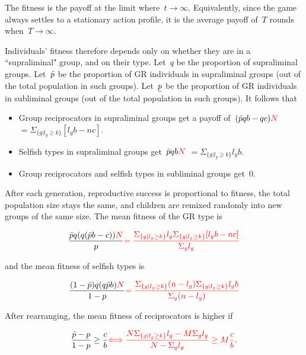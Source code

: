 \documentclass[12pt,a4paper]{article}
\newcommand{\mm}[1]{{\color{red} #1}}
\begin{document}
The fitness is the payoff at the limit where~$t\to\infty$. Equivalently, since the game always settles to a stationary action profile, it is the average payoff of~$T$ rounds when~$T\to\infty$. 

%
Individuals' fitness therefore depends only on whether they are in a ``supraliminal" group, and on their type. Let~$q$ be the 
proportion of supraliminal groups. Let~$\bar{p}$ be the proportion of 
GR individuals in supraliminal groups (out of the total population in such groups). Let~$\underline{p}$ be the proportion of GR individuals in subliminal groups (out of the total population in such groups). It follows that
\begin{itemize}
    \item Group reciprocators in supraliminal groups get a payoff of~$(\bpi qb - qc)\mm{N}$ \mm{$= \Sigma_{\{g|l_g \geq k\}}[l_gb-nc]$}.
    \item Selfish types in supraliminal groups get~$\bpi qb\mm{N}$ \mm{$= \Sigma_{\{g|l_g \geq k\}}l_gb$}.
    \item Group reciprocators and selfish types in subliminal groups get~$0$.
\end{itemize}

After each generation, reproductive success is proportional to fitness, the total population size stays the same, and children are remixed randomly into new groups of the same size.
%
The mean fitness of the GR type is

\begin{equation*}
\frac{
  \bpi q(q(\bpi b - c))\mm{N}
}{
  p
}
\mm{=\frac{\Sigma_{\{g|l_g \geq k\}}l_g \Sigma_{\{g|l_g \geq k\}}[l_gb-nc]}{\Sigma_gl_g}}
\end{equation*}

and the mean fitness of selfish types is

\begin{equation*}
\frac{
  (1 - \bpi)q(q\bpi b)\mm{N}
}{
  1 - p
}
\mm{=\frac{\Sigma_{\{g|l_g \geq k\}}(n-l_g) \Sigma_{\{g|l_g \geq k\}}l_gb}{\Sigma_g(n-l_g)}}
\end{equation*}

After rearranging, the mean fitness of reciprocators is higher if


\begin{equation}
\label{gr-wins}
\frac{ \bpi - p}{ 1 - p} \ge \frac{c}{b}
\mm{\Longleftrightarrow \frac{N\Sigma_{\{g|l_g \geq k\}}l_g-M\Sigma_gl_g}{N-\Sigma_gl_g} \ge M\frac{c}{b}}.
\end{equation}
\end{document}
